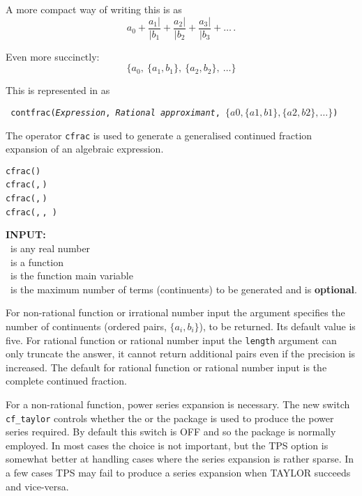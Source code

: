 A more compact way of writing this is as
\[a_0 + \frac{a_1|}{|b_1} + \frac{a_2|}{|b_2} + \frac{a_3|}{|b_3} + \ldots\,.\]

Even more succinctly:
\[\{a_0,\ \{a_1, b_1\},\ \{a_2, b_2\},\ \ldots\}\]

%
This is represented in {\REDUCE} as
\begin{center}\tt
  contfrac(\textsl{Expression},
    \textsl{Rational approximant},
                $\{a0, \{a1,b1\}, \{a2,b2\}, \dots\}$)
\end{center}

\hypertarget{operator:CFRAC}{}
The operator \texttt{cfrac}
is used to generate a generalised continued
fraction expansion of an algebraic expression.

\begin{syntaxtable}
  \texttt{cfrac(}\texttt{)}\\
  \texttt{cfrac(}\texttt{,}\,\texttt{)}\\
  \texttt{cfrac(}\texttt{,}\,\texttt{)}\\
  \texttt{cfrac(}\texttt{,}\,\texttt{,}\,%
  \texttt{)}
\end{syntaxtable}


\textbf{INPUT:}\\
 \ is any real number\\
 \ is a function\\
 \ is the function main variable\\
 \ is the maximum number of terms (continuents) to be
generated and is \textbf{optional}.

For non-rational function or irrational number input the 
argument specifies the number of continuents (ordered pairs, $\{a_i,b_i\}$),
to be returned. Its default value is five.
For rational function or rational number input the
\texttt{length} argument can only truncate the answer, it cannot
return additional pairs even if the precision is increased.
The default for rational function or rational number input is the
complete continued fraction.

\hypertarget{switch:CF_TAYLOR}{}

For a non-rational function, power series expansion is necessary. The new
switch \texttt{cf\_taylor} controls whether the  or the  package is
used to produce the power series required. By default this switch is OFF and
so the  package is normally employed.
In most cases the choice is not important, but the TPS option is somewhat
better at handling cases where the series expansion is rather sparse.
In a few cases TPS may fail to produce a series expansion when TAYLOR succeeds
and vice-versa.

